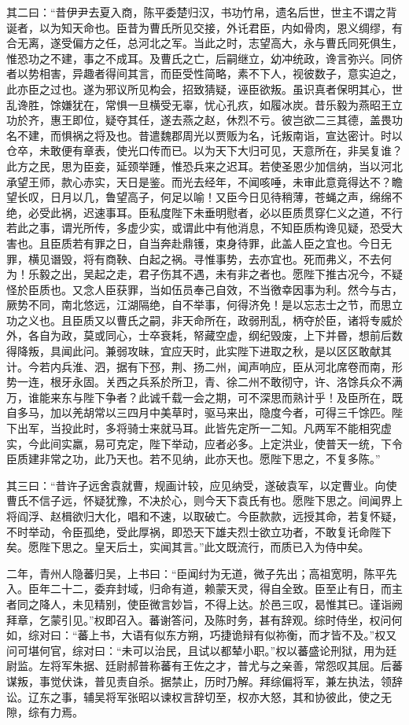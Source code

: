 \documentclass[12pt,UTF8]{ctexbook}
\begin{document}
其二曰：“昔伊尹去夏入商，陈平委楚归汉，书功竹帛，遗名后世，世主不谓之背诞者，以为知天命也。臣昔为曹氏所见交接，外讬君臣，内如骨肉，恩义绸缪，有合无离，遂受偏方之任，总河北之军。当此之时，志望高大，永与曹氏同死俱生，惟恐功之不建，事之不成耳。及曹氏之亡，后嗣继立，幼冲统政，谗言弥兴。同侪者以势相害，异趣者得间其言，而臣受性简略，素不下人，视彼数子，意实迫之，此亦臣之过也。遂为邪议所见构会，招致猜疑，诬臣欲叛。虽识真者保明其心，世乱谗胜，馀嫌犹在，常惧一旦横受无辜，忧心孔疚，如履冰炭。昔乐毅为燕昭王立功於齐，惠王即位，疑夺其任，遂去燕之赵，休烈不亏。彼岂欲二三其德，盖畏功名不建，而惧祸之将及也。昔遣魏郡周光以贾贩为名，讬叛南诣，宣达密计。时以仓卒，未敢便有章表，使光口传而已。以为天下大归可见，天意所在，非吴复谁？此方之民，思为臣妾，延颈举踵，惟恐兵来之迟耳。若使圣恩少加信纳，当以河北承望王师，款心赤实，天日是鉴。而光去经年，不闻咳唾，未审此意竟得达不？瞻望长叹，日月以几，鲁望高子，何足以喻！又臣今日见待稍薄，苍蝇之声，绵绵不绝，必受此祸，迟速事耳。臣私度陛下未垂明慰者，必以臣质贯穿仁义之道，不行若此之事，谓光所传，多虚少实，或谓此中有他消息，不知臣质构谗见疑，恐受大害也。且臣质若有罪之日，自当奔赴鼎镬，束身待罪，此盖人臣之宜也。今日无罪，横见谮毁，将有商鞅、白起之祸。寻惟事势，去亦宜也。死而弗义，不去何为！乐毅之出，吴起之走，君子伤其不遇，未有非之者也。愿陛下推古况今，不疑怪於臣质也。又念人臣获罪，当如伍员奉己自效，不当徼幸因事为利。然今与古，厥势不同，南北悠远，江湖隔绝，自不举事，何得济免！是以忘志士之节，而思立功之义也。且臣质又以曹氏之嗣，非天命所在，政弱刑乱，柄夺於臣，诸将专威於外，各自为政，莫或同心，士卒衰耗，帑藏空虚，纲纪毁废，上下并昬，想前后数得降叛，具闻此问。兼弱攻昧，宜应天时，此实陛下进取之秋，是以区区敢献其计。今若内兵淮、泗，据有下邳，荆、扬二州，闻声响应，臣从河北席卷而南，形势一连，根牙永固。关西之兵系於所卫，青、徐二州不敢彻守，许、洛馀兵众不满万，谁能来东与陛下争者？此诚千载一会之期，可不深思而熟计乎！及臣所在，既自多马，加以羌胡常以三四月中美草时，驱马来出，隐度今者，可得三千馀匹。陛下出军，当投此时，多将骑士来就马耳。此皆先定所一二知。凡两军不能相究虚实，今此间实羸，易可克定，陛下举动，应者必多。上定洪业，使普天一统，下令臣质建非常之功，此乃天也。若不见纳，此亦天也。愿陛下思之，不复多陈。”

其三曰：“昔许子远舍袁就曹，规画计较，应见纳受，遂破袁军，以定曹业。向使曹氏不信子远，怀疑犹豫，不决於心，则今天下袁氏有也。愿陛下思之。间闻界上将阎浮、赵楫欲归大化，唱和不速，以取破亡。今臣款款，远授其命，若复怀疑，不时举动，令臣孤绝，受此厚祸，即恐天下雄夫烈士欲立功者，不敢复讬命陛下矣。愿陛下思之。皇天后土，实闻其言。”此文既流行，而质已入为侍中矣。

二年，青州人隐蕃归吴，上书曰：“臣闻纣为无道，微子先出；高祖宽明，陈平先入。臣年二十二，委弃封域，归命有道，赖蒙天灵，得自全致。臣至止有日，而主者同之降人，未见精别，使臣微言妙旨，不得上达。於邑三叹，曷惟其已。谨诣阙拜章，乞蒙引见。”权即召入。蕃谢答问，及陈时务，甚有辞观。综时侍坐，权问何如，综对曰：“蕃上书，大语有似东方朔，巧捷诡辩有似祢衡，而才皆不及。”权又问可堪何官，综对曰：“未可以治民，且试以都辇小职。”权以蕃盛论刑狱，用为廷尉监。左将军朱据、廷尉郝普称蕃有王佐之才，普尤与之亲善，常怨叹其屈。后蕃谋叛，事觉伏诛，普见责自杀。据禁止，历时乃解。拜综偏将军，兼左执法，领辞讼。辽东之事，辅吴将军张昭以谏权言辞切至，权亦大怒，其和协彼此，使之无隙，综有力焉。
\end{document}
